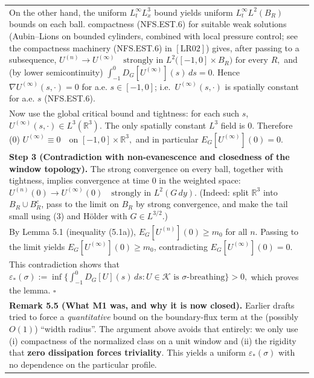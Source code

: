 \documentclass[
  11pt,
]{article}
\begin{document}
\begin{longtable}[]{@{}
  >{\raggedright\arraybackslash}p{}@{}}
\) On the other hand, the uniform \(L^\infty_tL^3_x\) bound yields uniform \(L^\infty_tL^2(B_R)\) bounds on each ball. compactness (NFS.EST.6) for suitable weak solutions (Aubin--Lions on bounded cylinders, combined with local pressure control; see the compactness machinery (NFS.EST.6) in \([\text{LR02}]\)) gives, after passing to a subsequence, \(
U^{(n)} \to U^{(\infty)} \quad\text{strongly in } L^2\big([-1,0]\times B_R\big) \text{ for every }R,
\) and (by lower semicontinuity) \(
\int_{-1}^{0} D_G[U^{(\infty)}](s)\,ds = 0.
\) Hence \(\nabla U^{(\infty)}(s,\cdot)=0\) for a.e. \(s\in[-1,0]\); i.e.~\(U^{(\infty)}(s,\cdot)\) is spatially constant for a.e. \(s\) (NFS.EST.6). \\
Now use the global critical bound and tightness: for each such \(s\), \(U^{(\infty)}(s,\cdot)\in L^3(\mathbb R^3)\). The only spatially constant \(L^3\) field is \(0\). Therefore (0) \(
U^{(\infty)} \equiv 0 \quad\text{on }[-1,0]\times\mathbb R^3,
\) and in particular \(E_G[U^{(\infty)}](0)=0\). \\
\textbf{Step 3 (Contradiction with non-evanescence and closedness of the window topology).} The strong convergence on every ball, together with tightness, implies convergence at time \(0\) in the weighted space: \(
U^{(n)}(0) \to U^{(\infty)}(0) \quad\text{strongly in } L^2(G\,dy).
\) (Indeed: split \(\mathbb R^3\) into \(B_R\cup B_R^c\), pass to the limit on \(B_R\) by strong convergence, and make the tail small using (3) and Hölder with \(G\in L^{3/2}\).) \\
By Lemma 5.1 (inequality (5.1a)), \(E_G[U^{(n)}](0)\ge m_0\) for all \(n\). Passing to the limit yields \(E_G[U^{(\infty)}](0)\ge m_0\), contradicting \(E_G[U^{(\infty)}](0)=0\). \\
This contradiction shows that \(
\varepsilon_\ast(\sigma) := \inf\Big\{\int_{-1}^{0} D_G[U](s)\,ds : U\in\mathcal K \text{ is }\sigma\text{-breathing}\Big\} > 0,
\) which proves the lemma. \(\square\) \\
\textbf{Remark 5.5 (What M1 was, and why it is now closed).} Earlier drafts tried to force a \emph{quantitative} bound on the boundary-flux term at the (possibly \(O(1)\)) ``width radius''. The argument above avoids that entirely: we only use (i) compactness of the normalized class on a unit window and (ii) the rigidity that \textbf{zero dissipation forces triviality}. This yields a uniform \(\varepsilon_\ast(\sigma)\) with no dependence on the particular profile. \\
\bottomrule
\end{longtable}
\end{document}
